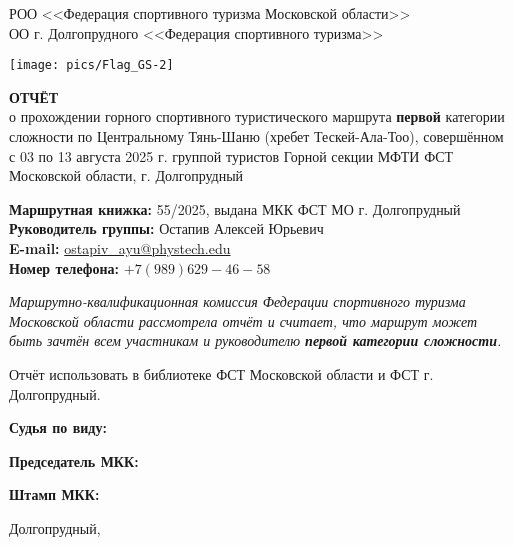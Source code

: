 \begin{titlepage}
\setlength\parindent{0pt}
	\begin{center}
		\large{РОО <<Федерация спортивного туризма Московской области>>\\
		ОО г. Долгопрудного <<Федерация спортивного туризма>>\\}
	\end{center}

	


	
	\begin{center}
		\texttt{[image: pics/Flag\_GS-2]}
		
		\Large{\bfseries{ОТЧЁТ}} \\
		\normalsize о прохождении горного спортивного туристического маршрута \textbf{первой} категории сложности по Центральному Тянь-Шаню (хребет Тескей-Ала-Тоо), совершённом с 03 по 13 августа 2025 г. группой туристов Горной секции МФТИ ФСТ Московской области, г. Долгопрудный
	\end{center}
	\vspace{1.5 cm}
	
	\textbf{Маршрутная книжка:} 55/2025, выдана МКК ФСТ МО г. Долгопрудный \\ 
	\textbf{Руководитель группы:} Остапив Алексей Юрьевич\\
	\textbf{E-mail:} \href{mailto: ostapiv\_ayu@phystech.edu}{ostapiv\_ayu@phystech.edu}\\
	\textbf{Номер телефона:} $+7(989)629-46-58$
	
	\vspace{0.2cm}
	
	\textit{Маршрутно-квалификационная комиссия Федерации спортивного туризма Московской области рассмотрела отчёт и считает, что маршрут может быть зачтён всем участникам и руководителю \textbf{первой категории сложности}.}

	\vspace{0.2cm}
	
	Отчёт использовать в библиотеке ФСТ Московской области и ФСТ г. Долгопрудный.
	
	\vspace{0.8cm}
	\textbf{Судья по виду:} 
	
	
	\vspace{0.8cm}
	\textbf{Председатель МКК:}
	
	\vspace{0.8cm}
	\textbf{Штамп МКК:}
	
	\vfill
	\begin{center}
		Долгопрудный,   \the\year{}
	\end{center}
\end{titlepage}